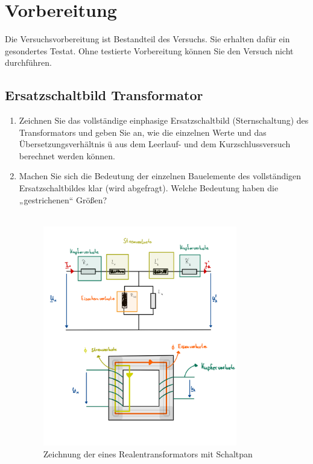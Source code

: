 \section{Vorbereitung}
{Die Versuchsvorbereitung ist Bestandteil des Versuchs. Sie erhalten dafür ein gesondertes Testat.
Ohne testierte Vorbereitung können Sie den Versuch nicht durchführen.}
\subsection{Ersatzschaltbild Transformator}
\begin{enumerate}[label=\alph*)]
  \item Zeichnen Sie das vollständige einphasige Ersatzschaltbild (Sternschaltung) des Transformators und geben Sie an, wie die einzelnen Werte und das Übersetzungsverhältnis ü aus dem Leerlauf- und dem Kurzschlussversuch berechnet werden können. 
  \item Machen Sie sich die Bedeutung der einzelnen Bauelemente des vollständigen Ersatzschaltbildes klar (wird abgefragt). Welche Bedeutung haben die „gestrichenen“ Größen?\\ \ \\
  \begin{figure}[h!]
  	\begin{center}
  		\includegraphics[width=0.8\textwidth]{img/2.1.2.4.png}
  	\end{center}
  	\caption{Zeichnung der eines Realentransformators mit Schaltpan }\label{img/2.1.2.4}

\end{figure}
\end{enumerate}
